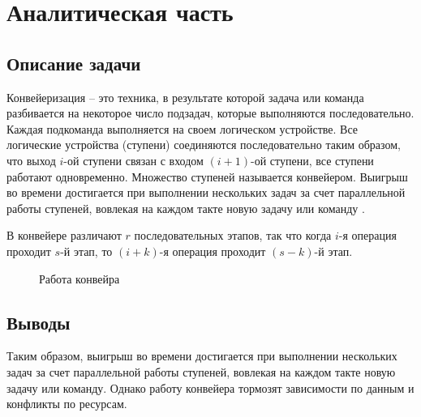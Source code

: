 \newpage
\section{Аналитическая часть}

\subsection{Описание задачи}

Конвейеризация – это техника, в результате которой  задача или  команда разбивается  на некоторое число подзадач, которые  выполняются последовательно. Каждая  подкоманда   выполняется на своем логическом  устройстве.    Все     логические    устройства   (ступени)  соединяются последовательно таким образом, что выход  $i$-ой   ступени   связан   с   входом   $(i+1)$-ой   ступени,  все ступени  работают  одновременно.  Множество  ступеней называется    конвейером.    Выигрыш     во    времени достигается при  выполнении  нескольких задач  за  счет параллельной   работы   ступеней,  вовлекая  на  каждом такте новую задачу или команду \cite{Conveer}.

В конвейере различают $r$ последовательных этапов, так что когда $i$-я операция
проходит $s$-й этап, то $(i+k)$-я операция проходит $(s-k)$-й этап.

\begin{figure}[H]
    \caption{Работа конвейра}
    \label{img:conveer}
\end{figure}

\subsection{Выводы}

Таким образом, выигрыш во времени достигается при выполнении нескольких задач за
счет параллельной работы ступеней, вовлекая на каждом такте новую задачу или
команду. Однако работу конвейера тормозят зависимости  по данным и конфликты по ресурсам.
